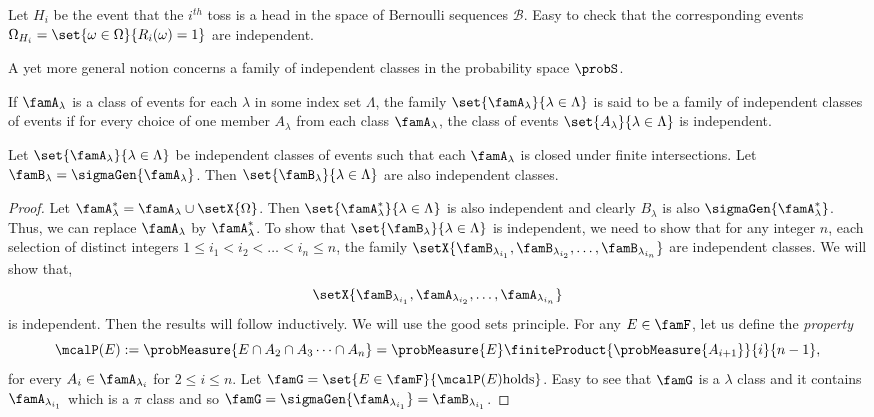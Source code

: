 \begin{Example}
    Let $H_i$ be the event that the $i^{th}$ toss is a head in the space of Bernoulli sequences $\mathcal{B}$.
    Easy to check that the corresponding events $\Omega_{H_i} = \set{\omega\in\Omega}{R_i(\omega) = 1}$ 
    are independent.
\end{Example}
A yet more general notion concerns a family of independent classes in the probability space $\probS$.
\begin{Definition}
If $\famA_{\lambda}$ is a class of events
for each $\lambda$ in some index set $\Lambda$, the family $\set{\famA_{\lambda}}{\lambda \in \Lambda}$ is
said to be a family of independent classes of events if for every choice of one member $A_{\lambda}$ from each
class $\famA_{\lambda}$, the class of events $\set{A_{\lambda}}{\lambda \in \Lambda}$ is independent.
\end{Definition}
\begin{Theorem}
    Let $\set{\famA_{\lambda}}{\lambda\in\Lambda}$ be independent classes of events such that each
    $\famA_{\lambda}$ is closed under finite intersections. Let $\famB_{\lambda} =
    \sigmaGen{\famA_{\lambda}}$. Then $\set{\famB_{\lambda}}{\lambda \in \Lambda}$ are also independent
    classes.
\end{Theorem}
\begin{proof}
    Let $\famA_{\lambda}^{\ast} = \famA_{\lambda} \cup \setX{\Omega}$. Then
    $\set{\famA_{\lambda}^{\ast}}{\lambda \in \Lambda}$ is also independent and clearly $B_{\lambda}$ is also
    $\sigmaGen{\famA_{\lambda}^{\ast}}$. Thus, we can replace $\famA_{\lambda}$ by $\famA_{\lambda}^{\ast}$.
    To show that $\set{\famB_{\lambda}}{\lambda \in \Lambda}$ is
    independent, we need to show that for any integer $n$, each selection of distinct integers $1\leq i_1 <
    i_2 < \dots < i_n\leq n$, the family 
    $\setX{\famB_{\lambda_{i_1}},\famB_{\lambda_{i_2}},\dots,\famB_{\lambda_{i_n}}}$ are independent
    classes. We will show that,
    \[\setX{\famB_{\lambda_{i_1}},\famA_{\lambda_{i_2}},\ldots,\famA_{\lambda_{i_n}}}\]
    is independent. Then the results will follow inductively. We will use the good sets principle.
    For any $E \in \famF$, let us define the \emph{property}
    \[\mcalP(E) := \probMeasure{E\cap A_2\cap A_3\dots\cap A_n} = 
	\probMeasure{E}\finiteProduct{\probMeasure{A_{i+1}}}{i}{n-1},\]
    for every $A_i \in \famA_{\lambda_i}$ for $2\leq i \leq n$.
    Let $\famG = \set{E\in\famF}{\mcalP(E)\text{holds}}$. 
    Easy to see that $\famG$ is a $\lambda$ class and it contains $\famA_{\lambda_{i_1}}$ which is a $\pi$
    class and so $\famG = \sigmaGen{\famA_{\lambda_{i_1}}} = \famB_{\lambda_{i_1}}$.

\end{proof}
